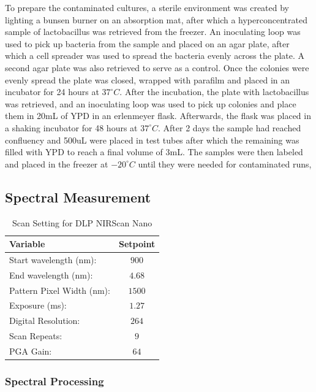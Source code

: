 \documentclass[12pt]{report}
\begin{document}
To prepare the contaminated cultures, a sterile environment was created by lighting a bunsen burner on an absorption mat, after which a hyperconcentrated sample of lactobacillus was retrieved from the freezer. An inoculating loop was used to pick up bacteria from the sample and placed on an agar plate, after which a cell spreader was used to spread the bacteria evenly across the plate. A second agar plate was also retrieved to serve as a control. Once the colonies were evenly spread the plate was closed, wrapped with parafilm and placed in an incubator for 24 hours at $37^{\circ}C$. After the incubation, the plate with lactobacillus was retrieved, and an inoculating loop was used to pick up colonies and place them in 20mL of YPD in an erlenmeyer flask. Afterwards, the flask was placed in a shaking incubator for 48 hours at $37^{\circ}C$. After 2 days the sample had reached confluency and 500uL were placed in test tubes after which the remaining was filled with YPD to reach a final volume of 3mL. The samples were then labeled and placed in the freezer at $-20^{\circ}C$ until they were needed for contaminated runs,   


\subsection{Spectral Measurement}

\begin{table}
    \centering
        \begin{tabular}{l c}
        \toprule
        Variable & Setpoint\\
        \midrule
        Start wavelength (nm): & $900$ \\
        End wavelength (nm): & $4.68$ \\
        Pattern Pixel Width (nm): & $1500$ \\
        Exposure (ms): & $1.27$ \\
        Digital Resolution: & $264$ \\
        Scan Repeats: & $9$ \\
        PGA Gain: & $64$ \\
        \bottomrule
        \end{tabular}
        \caption{Scan Setting for DLP NIRScan Nano}
        \label{tab:scaninfo}
\end{table}

\subsubsection{Spectral Processing}
\end{document}
